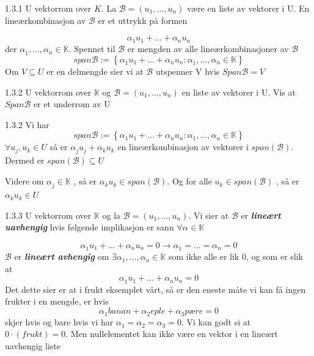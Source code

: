 \documentclass[a4paper,norsk]{article}
\begin{document}
\begin{definitionbox}{1.3.1}{}
U vektorrom over $ K $. La $ \mathcal{B } = \left( u_1, ..., u_n \right)  $ være en liste av vektorer i U. En lineærkombinasjon av $ \mathcal{B} $ er et uttrykk på formen

\[
    \alpha_{1}^{} u_1 + ... + \alpha_{n}^{} u_n
\]
der $ \alpha_{1}^{}, ..., \alpha_{n}^{} \in \mathbb{K}  $. Spennet til $ \mathcal{B} $ er mengden av alle lineærkombinasjoner av $ \mathcal{B} $ 
\[
    span \mathcal{B} := \left\{ \alpha_{1}^{} u_1 + ... + \alpha_{n}^{} u_n : \alpha_{1}^{} , ..., \alpha_{n}^{} \in \mathbb{K} \right\} 
\]
Om $ V \subseteq U $ er en delmengde sier vi at $ \mathcal{B} $ utspenner V hvis $ Span \mathcal{B}  = V$ 
\end{definitionbox}

\begin{oppgavebox}{1.3.2}{}
U vektorrom over $ \mathbb{K} $ og $ \mathcal{B} = \left( u_1, ..., u_n \right)  $ en liste av vektorer i U. Vis at $ Span \mathcal{B}  $ er et underrom av U 

\begin{proofbox}{1.3.2}{}
Vi har
\[
    span \mathcal{B} := \left\{ \alpha_{1}^{} u_1 + ... + \alpha_{n}^{} u_n : \alpha_{1}^{} , ..., \alpha_{n}^{} \in \mathbb{K} \right\} 
\]
$ \forall u_j, u_k \in U $ så er $ \alpha_{j}^{} u_j + \alpha_{k}^{} u_k $ en lineærkombinasjon av vektorer i  $ span \left( \mathcal{B} \right)  $. Dermed er $ span \left( \mathcal{B} \right) \subseteq U  $ 

Videre om $ \alpha_{j}^{} \in \mathbb{K} $ , så er $ \alpha_{k}^{} u_k \in  span \left( \mathcal{B} \right)  $. Og for alle $ u_k \in span \left( \mathcal{B} \right)  $ , så er $ \alpha_{k}^{} u_k \in  U $ 
\end{proofbox}
\end{oppgavebox}

\begin{definitionbox}{1.3.3}{}
U vektorrom over $ \mathbb{K} $ og la $ \mathcal{B} = \left( u_1, ..., u_n \right)  $. Vi sier at $ \mathcal{B} $ er \textbf{\textit{lineært uavhengig}} hvis følgende implikasjon er sann $ \forall \alpha_{}^{} \in  \mathbb{K} $ 

\[
    \alpha_{1}^{} u_1 + ... + \alpha_{n}^{} u_n = 0 \rightarrow \alpha_{1}^{} = ... = \alpha_{n}^{} = 0
\]
$ \mathcal{B} $ er \textbf{\textit{lineært avhengig}} om $ \exists  \alpha_{1}^{} , ..., \alpha_{n}^{} \in \mathbb{K}$ som ikke alle er lik 0, og som er slik at 
\[
    \alpha_{1}^{} u_1 + ... + \alpha_{n}^{} u_n = 0
\]
Det dette sier er at i frukt eksemplet vårt, så er den eneste måte vi kan få ingen frukter i en mengde, er hvis 
\[
    \alpha_{1}^{}  banan + \alpha_{2}^{}  eple + \alpha_{3}^{}  pære = 0
\]
skjer hvis og bare hvis vi har $ \alpha_{1}^{}  = \alpha_{2}^{}  = \alpha_{3}^{} = 0  $. Vi kan godt si at $ 0 \cdot \left( frukt \right) = 0 $. Men nullelementet kan ikke være en vektor i en lineært uavhengig liste  
\end{definitionbox}
\end{document}
